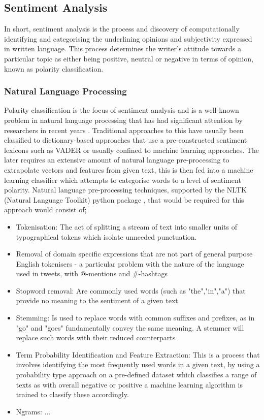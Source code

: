 \documentclass[oneside, 10pt]{article}
\begin{document}
		
		\subsection{Sentiment Analysis}\label{sentiment}
		In short, sentiment analysis is the process and discovery of computationally identifying and categorising the underlining opinions and subjectivity expressed in written language. This process determines the writer's attitude towards a particular topic as either being positive, neutral or negative in terms of opinion, known as polarity classification. 		
			
			\subsubsection{Natural Language Processing}\label{algorithms}
			Polarity classification is the focus of sentiment analysis and is a well-known problem in natural language processing that has had significant attention by researchers in recent years \cite{1}\cite{3}\cite{6}\cite{10}. Traditional approaches to this have usually been classified to dictionary-based approaches that use a pre-constructed sentiment lexicons such as VADER or usually confined to machine learning approaches. The later requires an extensive amount of natural language pre-processing to extrapolate vectors and features from given text, this is then fed into a machine learning classifier which attempts to categorise words to a level of sentiment polarity. Natural language pre-processing techniques, supported by the NLTK (Natural Language Toolkit) python package , that would be required for this approach would consist of;
			
			\begin{itemize}
				\item Tokenisation: The act of splitting a stream of text into smaller units of typographical tokens which isolate unneeded punctuation.
				\item Removal of domain specific expressions that are not part of general purpose English tokenisers - a particular problem with the nature of the language used in tweets, with @-mentions and \#-hashtags
				\item Stopword removal: Are commonly used words (such as "the","in","a") that provide no meaning to the sentiment of a given text
				\item Stemming: Is used to replace words with common suffixes and prefixes, as in "go" and "goes" fundamentally convey the same meaning. A stemmer will replace such words with their reduced counterparts
				\item Term Probability Identification and Feature Extraction: This is a process that involves identifying the most frequently used words in a given text, by using a probability type approach on a pre-defined dataset which classifies a range of texts as with overall negative or positive a machine learning algorithm is trained to classify these accordingly.
				\item Ngrams: ...
			\end{itemize}
			
\end{document}
